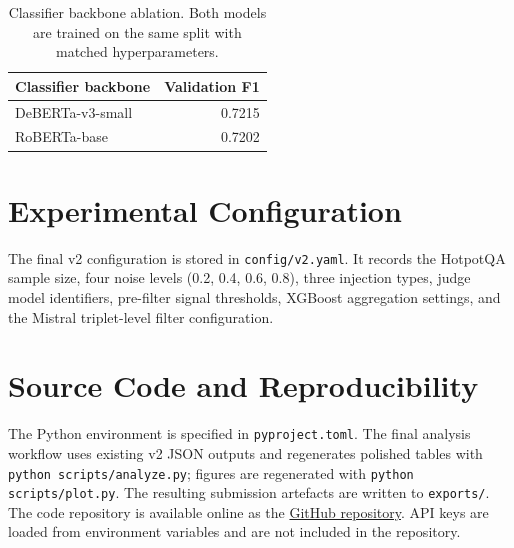 \begin{table}[H]
\centering
\small
\caption{Classifier backbone ablation. Both models are trained on the same split with matched hyperparameters.}
\label{tab:appendix-classifier-ablation}
\begin{tabular}{lr}
\toprule
Classifier backbone & Validation F1 \\
\midrule
DeBERTa-v3-small & 0.7215 \\
RoBERTa-base & 0.7202 \\
\bottomrule
\end{tabular}
\end{table}

\chapter{Experimental Configuration}
\label{app:config}

The final v2 configuration is stored in \texttt{config/v2.yaml}. It records the
HotpotQA sample size, four noise levels (0.2, 0.4, 0.6, 0.8), three injection
types, judge model identifiers, pre-filter signal thresholds, XGBoost
aggregation settings, and the Mistral triplet-level filter configuration.

\chapter{Source Code and Reproducibility}
\label{app:reproducibility}

The Python environment is specified in \texttt{pyproject.toml}. The final
analysis workflow uses existing v2 JSON outputs and regenerates polished tables
with \texttt{python scripts/analyze.py}; figures are regenerated with
\texttt{python scripts/plot.py}. The resulting submission artefacts are written
to \texttt{exports/}. The code repository is available online as the
\href{https://github.com/adeshgaurav19/meta-evaluation-llm-judges-thesis}{GitHub repository}.
API keys are loaded from environment variables and are not included in the
repository.
